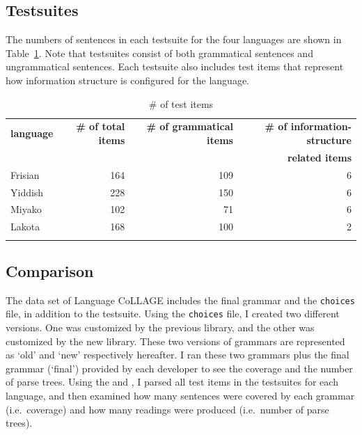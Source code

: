 \subsection{Testsuites}
\label{13:ssec:lc-testsuites}


The numbers of sentences in each testsuite for the four languages are
shown in Table~\ref{tbl:lc:testsites}. Note that testsuites consist of
both grammatical sentences and ungrammatical sentences.  Each
testsuite also includes test items that represent how information
structure is configured for the language.


\begin{table}[!t]
\small
\centering
\caption{\# of test items}
\label{tbl:lc:testsites}
\begin{tabular}{lrrr}
\lsptoprule
\textbf{language} & \textbf{\# of total items} & \textbf{\# of grammatical items}  & \textbf{\# of information-structure}\\
& & & \textbf{related items} \\ \hline
\midrule
Frisian & 164 & 109  & 6\\
Yiddish  & 228 & 150 & 6\\
Miyako & 102 & 71 & 6\\
Lakota & 168 & 100 & 2 \\
\lspbottomrule 
\end{tabular}
\end{table}




\subsection{Comparison}
\label{13:ssec:lc-comp}


The data set of Language CoLLAGE includes the final grammar and the
\texttt{choices} file, in addition to the testsuite. Using the
\texttt{choices} file, I created two different versions. One was
customized by the previous library, and the other was customized by
the new library. These two versions of grammars are represented as
`old' and `new' respectively hereafter.  I ran these two grammars plus
the final grammar (`final') provided by each developer to see the
coverage and the number of parse trees.  Using the \isi{\lkb} and
\isi{\itsdb}, I parsed all test items in the testsuites for each
language, and then examined how many sentences were covered by each
grammar (i.e.\ coverage) and how many readings were produced
(i.e.\ number of parse trees).


